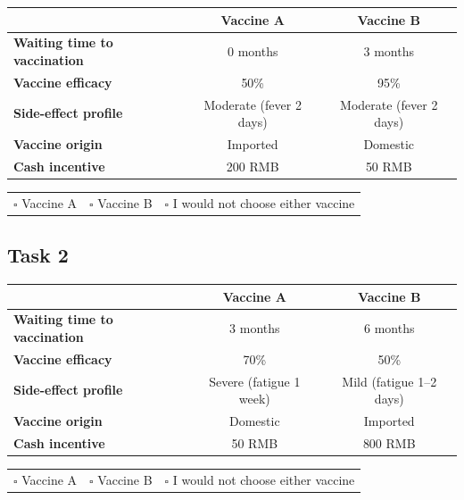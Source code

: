 \documentclass[12pt]{article}
\begin{document}
\begin{center}
\small
\begin{tabular}{@{}p{5cm}cc@{}}
    \toprule
    & \textbf{Vaccine A} & \textbf{Vaccine B} \\
    \midrule
    \textbf{Waiting time to vaccination} & 0 months & 3 months \\
    \textbf{Vaccine efficacy} & 50\% & 95\% \\
    \textbf{Side-effect profile} & Moderate (fever 2 days) & Moderate (fever 2 days) \\
    \textbf{Vaccine origin} & Imported & Domestic \\
    \textbf{Cash incentive} & 200 RMB & 50 RMB \\
    \bottomrule
\end{tabular}

\vspace{1em}
\begin{tabular}{@{}ccc@{}}
    $\square$ Vaccine A & $\square$ Vaccine B & $\square$ I would not choose either vaccine \\
\end{tabular}
\end{center}

\subsection*{Task 2}

\begin{center}
\small
\begin{tabular}{@{}p{5cm}cc@{}}
    \toprule
    & \textbf{Vaccine A} & \textbf{Vaccine B} \\
    \midrule
    \textbf{Waiting time to vaccination} & 3 months & 6 months \\
    \textbf{Vaccine efficacy} & 70\% & 50\% \\
    \textbf{Side-effect profile} & Severe (fatigue 1 week) & Mild (fatigue 1--2 days) \\
    \textbf{Vaccine origin} & Domestic & Imported \\
    \textbf{Cash incentive} & 50 RMB & 800 RMB \\
    \bottomrule
\end{tabular}

\vspace{1em}
\begin{tabular}{@{}ccc@{}}
    $\square$ Vaccine A & $\square$ Vaccine B & $\square$ I would not choose either vaccine \\
\end{tabular}
\end{center}
\end{document}
